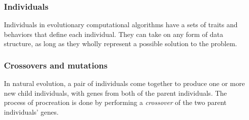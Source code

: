 \subsubsection{Individuals}
Individuals in evolutionary computational algorithms have a sets of traits and behaviors that define each individual. They can take on any form of data structure, as long as they wholly represent a possible solution to the problem. 



\subsubsection{Crossovers and mutations}
In natural evolution, a pair of individuals come together to produce one or more new child individuals, with genes from both of the parent individuals. The process of procreation is done by performing a \emph{crossover} of the two parent individuals' genes.


